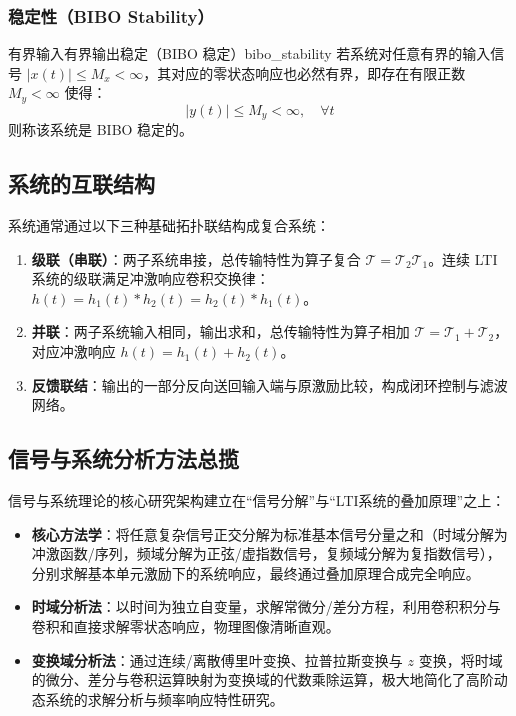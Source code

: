 \documentclass[11pt,a4paper,fontset=fandol]{ctexart}
\theoremstyle{remark}
\begin{document}
\subsubsection{稳定性（BIBO Stability）}
\begin{definition}{有界输入有界输出稳定（BIBO 稳定）}{bibo_stability}
若系统对任意有界的输入信号 $|x(t)| \le M_x < \infty$，其对应的零状态响应也必然有界，即存在有限正数 $M_y < \infty$ 使得：
\begin{equation}
    |y(t)| \le M_y < \infty, \quad \forall t
\end{equation}
则称该系统是 BIBO 稳定的。
\end{definition}

\subsection{系统的互联结构}
系统通常通过以下三种基础拓扑联结构成复合系统：
\begin{enumerate}
    \item \textbf{级联（串联）}：两子系统串接，总传输特性为算子复合 $\mathcal{T} = \mathcal{T}_2 \mathcal{T}_1$。连续 LTI 系统的级联满足冲激响应卷积交换律：$h(t) = h_1(t) * h_2(t) = h_2(t) * h_1(t)$。
    \item \textbf{并联}：两子系统输入相同，输出求和，总传输特性为算子相加 $\mathcal{T} = \mathcal{T}_1 + \mathcal{T}_2$，对应冲激响应 $h(t) = h_1(t) + h_2(t)$。
    \item \textbf{反馈联结}：输出的一部分反向送回输入端与原激励比较，构成闭环控制与滤波网络。
\end{enumerate}

\subsection{信号与系统分析方法总揽}
信号与系统理论的核心研究架构建立在“信号分解”与“LTI系统的叠加原理”之上：
\begin{itemize}
    \item \textbf{核心方法学}：将任意复杂信号正交分解为标准基本信号分量之和（时域分解为冲激函数/序列，频域分解为正弦/虚指数信号，复频域分解为复指数信号），分别求解基本单元激励下的系统响应，最终通过叠加原理合成完全响应。
    \item \textbf{时域分析法}：以时间为独立自变量，求解常微分/差分方程，利用卷积积分与卷积和直接求解零状态响应，物理图像清晰直观。
    \item \textbf{变换域分析法}：通过连续/离散傅里叶变换、拉普拉斯变换与 $z$ 变换，将时域的微分、差分与卷积运算映射为变换域的代数乘除运算，极大地简化了高阶动态系统的求解分析与频率响应特性研究。
\end{itemize}
\end{document}
